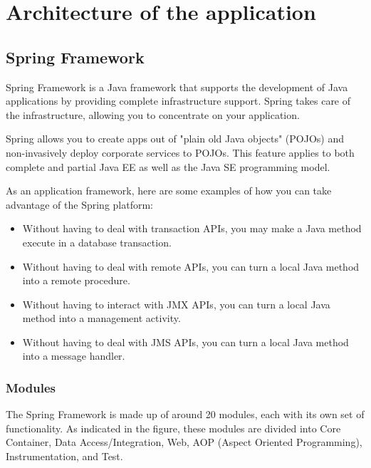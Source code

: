 \chapter{Architecture of the application}\label{sect:architecture}

\section {Spring Framework}
\tab Spring Framework \cite{spring_in_action} is a Java framework that supports the development of Java applications by providing complete infrastructure support. Spring takes care of the infrastructure, allowing you to concentrate on your application.

\tab Spring allows you to create apps out of "plain old Java objects" (POJOs) and non-invasively deploy corporate services to POJOs. This feature applies to both complete and partial Java EE as well as the Java SE programming model.

As an application framework, here are some examples of how you can take advantage of the Spring platform:
\begin{itemize}
    \item Without having to deal with transaction APIs, you may make a Java method execute in a database transaction.
    \item Without having to deal with remote APIs, you can turn a local Java method into a remote procedure.
    \item Without having to interact with JMX APIs, you can turn a local Java method into a management activity.
    \item Without having to deal with JMS APIs, you can turn a local Java method into a message handler.
\end{itemize}

\subsection*{Modules}
\tab The Spring Framework is made up of around 20 modules, each with its own set of functionality. As indicated in the figure, these modules are divided into Core Container, Data Access/Integration, Web, AOP (Aspect Oriented Programming), Instrumentation, and Test. \newline

